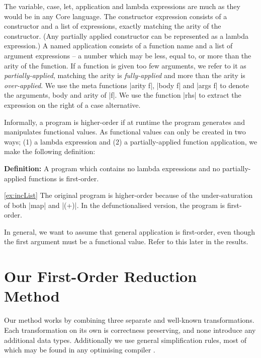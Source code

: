 \documentclass[preprint]{sigplanconf}
\newenvironment{definition}
    {\textbf{Definition:}}
    {\noexample}
\begin{document}
The variable, case, let, application and lambda expressions are much as they would be in any Core language. The constructor expression consists of a constructor and a list of expressions, exactly matching the arity of the constructor. (Any partially applied constructor can be represented as a lambda expression.) A named application consists of a function name and a list of argument expressions -- a number which may be less, equal to, or more than the arity of the function. If a function is given too few arguments, we refer to it as \textit{partially-applied}, matching the arity is \textit{fully-applied} and more than the arity is \textit{over-applied}. We use the meta functions |arity f|, |body f| and |args f| to denote the arguments, body and arity of |f|. We use the function |rhs| to extract the expression on the right of a case alternative.

Informally, a program is higher-order if at runtime the program generates and manipulates functional values. As functional values can only be created in two ways; (1) a lambda expression and (2) a partially-applied function application, we make the following definition:

\begin{definition}
A program which contains no lambda expressions and no partially-applied functions is first-order.
\end{definition}

\begin{examplerevisit}{\ref{ex:incList}}
The original program is higher-order because of the under-saturation of both |map| and |(+)|. In the defunctionalised version, the program is first-order.
\end{examplerevisit}

 In general, we want to assume that general application is first-order, even though the first argument must be a functional value. Refer to this later in the results.

\section{Our First-Order Reduction Method}
\label{sec:overview}

Our method works by combining three separate and well-known transformations. Each transformation on its own is correctness preserving, and none introduce any additional data types. Additionally we use general simplification rules, most of which may be found in any optimising compiler \cite{spj:transformation}.
\end{document}
